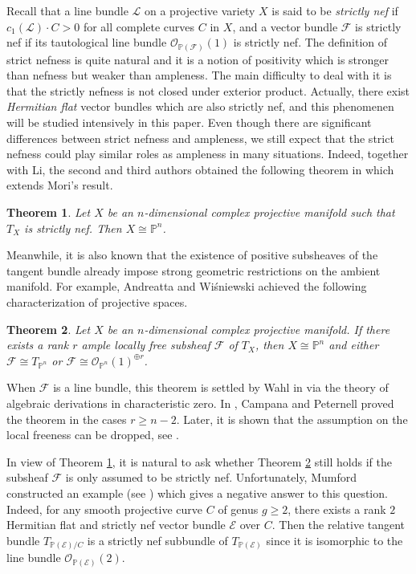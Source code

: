 \documentclass[english,reqno]{amsart}
\newcommand\bbP{{\mathbb P}}
\newcommand\sE{{\mathscr E}}
\newcommand\sF{{\mathscr F}}
\newcommand\sL{{\mathscr L}}
\newcommand\sO{{\mathscr O}}
\theoremstyle{plain}
\newtheorem{thm}{Theorem}[section]
\theoremstyle{definition}
\numberwithin{equation}{section} %
\begin{document}
Recall that  a line bundle $\sL$ on a projective variety $X$  is said to be
\emph{strictly nef} if $c_1(\sL)\cdot C>0$ for all complete curves $C$ in $X$,
and a vector bundle $\sF$   is strictly nef if its tautological line
bundle $\sO_{\mathbb{P}(\sF)}(1)$ is strictly nef. The definition of strict nefness is quite natural and it is a notion of positivity which is stronger than nefness but weaker than ampleness.  The main difficulty to deal with it is that the strictly nefness is not closed under exterior product.  Actually, there exist \emph{Hermitian flat} vector bundles which are also strictly nef, and this phenomenen will be studied intensively in this paper.
Even though there are significant differences between strict nefness and ampleness, we  still expect that the strict nefness could play similar roles as ampleness in many  situations. Indeed,  together with Li, the second and third authors obtained the following theorem in \cite{LiOuYang2019} which extends Mori's result.

\begin{thm}\cite[Theorem 1.4]{LiOuYang2019}
    \label{thm:Li-Ou-Yang}
    Let $X$ be an $n$-dimensional  complex projective manifold such that $T_X$ is strictly nef. Then $X\cong  \bbP^n$.
\end{thm}

Meanwhile, it is also known that the existence of positive subsheaves of the
tangent bundle already impose strong geometric restrictions on the
ambient manifold. For example,  Andreatta and Wi\'sniewski achieved
the following characterization of projective spaces.
\begin{thm}\cite[Theorem]{AndreattaWisniewski2001}
    \label{thm:Andreatta-Wisniewski}
    Let $X$ be an $n$-dimensional   complex projective manifold.
    If there exists   a rank $r$ ample locally free subsheaf $\sF$ of $T_X$, then $X\cong  \bbP^n$ and either $\sF\cong  T_{\bbP^n}$  or $\sF\cong \sO_{\bbP^n}(1)^{\oplus r}$.
\end{thm}


\noindent When $\sF$ is a line bundle, this theorem is settled by
Wahl in \cite{Wahl1983} via the theory of algebraic derivations in
characteristic zero. In \cite{CampanaPeternell1998}, Campana and
Peternell proved the theorem in the cases $r\geqslant n-2$. Later,
it is shown that the assumption on the  local freeness can be
dropped, see \cite{AproduKebekusPeternell2008,Liu2019}.

In view of Theorem \ref{thm:Li-Ou-Yang}, it is natural to ask whether  Theorem \ref{thm:Andreatta-Wisniewski}
still holds  if the subsheaf $\sF$ is only assumed to be strictly nef.  Unfortunately,  Mumford
constructed an example (see \cite[Chapter I, Example 10.6]{Hartshorne1970}) which gives a negative answer to this
question. Indeed,   for any smooth projective curve $C$
of genus $g\geqslant 2$,
    there exists a rank
    $2$ Hermitian flat and strictly nef vector bundle $\sE$ over $C$. Then  the relative tangent bundle $T_{\bbP(\sE)/C}$ is a strictly nef subbundle of $T_{\bbP(\sE)}$ since it is isomorphic to the line bundle $\sO_{\bbP(\sE)}(2)$.
\end{document}

